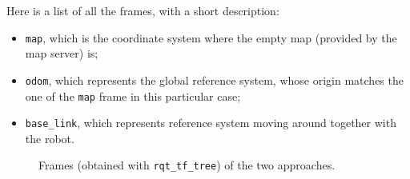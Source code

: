 \documentclass[11pt,a4paper]{article}
\begin{document}
Here is a list of all the frames, with a short description:
\begin{itemize}
    \item \texttt{map}, which is the coordinate system where the empty map (provided by the map server) is;
    \item \texttt{odom}, which represents the global reference system, whose origin matches the one of
            the \texttt{map} frame in this particular case;
    \item \texttt{base\_link}, which represents reference system moving around together with the robot.
\end{itemize}

\begin{figure}[H]
    \centering
    \caption[]{Frames (obtained with \texttt{rqt\_tf\_tree}) of the two approaches.}
\end{figure}
\end{document}
